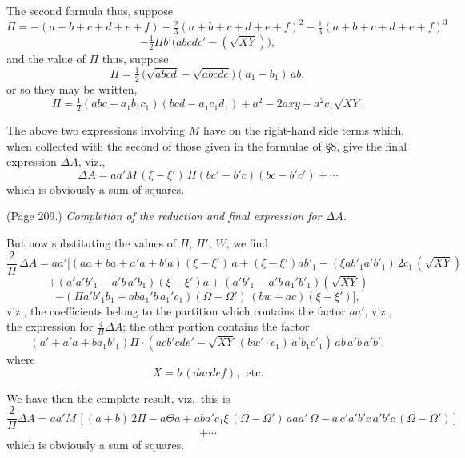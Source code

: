 \documentclass[11pt,a4paper]{article}
\theoremstyle{plain}
\theoremstyle{definition}
\begin{document}
The second formula thus, suppose
\[
\Pi = -(a + b + c + d + e + f) - \tfrac{2}{3}(a + b + c + d + e + f)^2 - \tfrac{1}{3}(a + b + c + d + e + f)^3
\]
\[
- \tfrac{1}{2}\Pi b' \big(abc d c' - (\sqrt{X Y})\big),
\]
and the value of $\Pi$ thus, suppose
\[
\Pi = \tfrac{1}{2}\,\big(\sqrt{a b c d} - \sqrt{a b c d c}\big) (a_1 - b_1)\,a b,
\]
or so they may be written,
\[
\Pi = \tfrac{1}{2} (a b c - a_1 b_1 c_1)(b c d - a_1 c_1 d_1) + a^2 - 2 a x y + a^2 c_1 \sqrt{X Y}.
\]

The above two expressions involving $M$ have on the right-hand side terms which, when collected with the second of those given in the formulae of \S 8, give the final expression $\Delta A$, viz.,
\[
\Delta A = a a' M\,(\xi - \xi')\,\Pi (b c' - b' c)(b c - b' c') + \cdots
\]
which is obviously a sum of squares.

\medskip

\noindent (Page 209.) \emph{Completion of the reduction and final expression for $\Delta A$.}

But now substituting the values of $\Pi$, $\Pi'$, $W$, we find
\[
\frac{2}{\Pi}\,\Delta A = a a' \Big[ (a a + b a + a' a + b' a)(\xi - \xi')\,a + (\xi - \xi') a b'_1 - (\xi a b'_1 a' b'_1)\,2 c_1\,(\sqrt{X Y})
\]
\[
+ (a' a' b'_1 - a' b\,a' b_1)(\xi - \xi') a + (a' b'_1 - a' b\,a_1' b'_1) (\sqrt{X Y})
\]
\[
- (\Pi a' b'_1 b_1 + a b a_1' b\,a_1' c_1) (\Omega - \Omega')\,(b w + a c) (\xi - \xi')\Big],
\]
viz., the coefficients belong to the partition which contains the factor $aa'$, viz., the expression for $\frac{4}{\Pi}\Delta A$; the other portion contains the factor
\[
( a' + a' a + b a_1 b'_1)\Pi \cdot (a c b' c d e' - \sqrt{X Y}\,(b w' \cdot c_1)\,a' b_1 c'_1)\,a b\,a' b\,a' b',
\]
where
\[
X = b\,(d a c d e f),\ \ \text{etc.}
\]

We have then the complete result, viz.\ this is
\[
\frac{2}{\Pi}\Delta A = a a' M\,[(a + b)\,2\Pi - a \Theta a + a b a' c_1 \xi\,(\Omega - \Omega')\,a a a'\,\Omega - a\,c' a' b' c\,a' b' c\,(\Omega - \Omega')]
\]
\[
+ \cdots
\]
which is obviously a sum of squares.

\medskip
\end{document}
